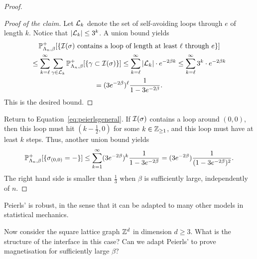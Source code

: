 \begin{proof}
    \begin{proof}[Proof of the claim]
        Let $\calL_k$ denote the set of self-avoiding loops through $e$
        of length $k$.
        Notice that $|\calL_k|\leq 3^k$.
        A union bound yields
        \begin{multline}
            \P_{\Lambda_n,\beta}^+[\{\text{$\calI(\sigma)$ contains a loop of length at least $\ell$ through $e$}\}]
            \\
            \leq
            \sum_{k=\ell}^\infty \sum_{\gamma\in\calL_k} 
            \P_{\Lambda_n,\beta}^+[\{\gamma\subset\calI(\sigma)\}]
            \leq
            \sum_{k=\ell}^\infty |\calL_k|\cdot e^{-2\beta k}
            \leq 
            \sum_{k=\ell}^\infty 3^k\cdot e^{-2\beta k}
            \\
            =
            (3e^{-2\beta})^\ell \frac{1}{1-3e^{-2\beta}}.
        \end{multline}
        This is the desired bound.
    \renewcommand{\qedsymbol}{}
    \end{proof}

    Return to Equation~\eqref{eq:peierlsgeneral}.
    If $\calI(\sigma)$ contains a loop around $(0,0)$, then this loop 
    must hit $(k-\frac12,0)$ for some $k\in\Z_{\geq 1}$,
    and this loop must have at least $k$ steps.
    Thus, another union bound yields
    \[
        \P_{\Lambda_n,\beta}^+[\{\sigma_{(0,0)}=-\}]
        \leq
        \sum_{k=1}^\infty 
        (3e^{-2\beta})^{k} \frac{1}{1-3e^{-2\beta}}
        =(3e^{-2\beta})\frac{1}{(1-3e^{-2\beta})^2}.
    \]
    The right hand side is smaller than $\frac13$ when $\beta$ is sufficiently large,
    independently of $n$.
\end{proof}

\begin{remark}
    Peierls' is robust,
    in the sense that it can be adapted to many other models in statistical mechanics.
\end{remark}

\begin{exercise}
    \label{exo:peierls_general}
    Now consider the square lattice graph $\Z^d$ in dimension $d\geq 3$.
    What is the structure of the interface in this case?
    Can we adapt Peierls' to prove magnetisation for sufficiently large $\beta$?
\end{exercise}
